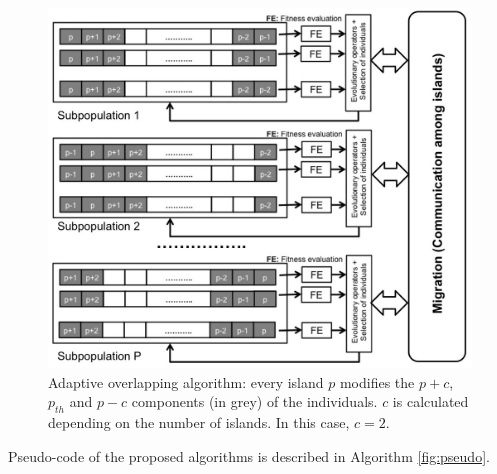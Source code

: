 \documentclass[preprint]{elsarticle}
\begin{document}
\begin{figure}
\centering
\includegraphics[width=12cm]{islandAdaptive.jpg}
\caption{Adaptive overlapping algorithm: every island $p$ modifies the  $p+c$,
  $p_{th}$ and $p-c$  components (in grey) of the individuals. $c$ is calculated depending on the number of islands. In this case, $c=2$.}
  \label{fig:adaptive}
\end{figure}

Pseudo-code of the proposed algorithms is described in Algorithm \ref{fig:pseudo}.
\end{document}
